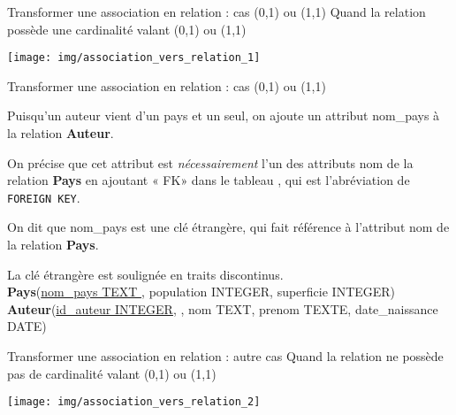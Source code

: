 \documentclass[10pt]{nsibeamer}
\begin{document}
\begin{frame}{Transformer une association en relation : cas (0,1) ou (1,1)}
	\alert{Quand la relation possède une cardinalité valant (0,1) ou (1,1)}
	\begin{center}
		\texttt{[image: img/association\_vers\_relation\_1]}
	\end{center}
\end{frame}



\begin{frame}{Transformer une association en relation : cas (0,1) ou (1,1)}

	Puisqu'un auteur vient d'un pays et un seul, on ajoute un attribut nom\_pays à la relation \textbf{Auteur}.

	On précise que cet attribut est \textit{nécessairement} l'un des attributs nom de la relation \textbf{Pays} en ajoutant « FK»  dans le tableau , qui est l'abréviation de \texttt{FOREIGN KEY}.

	On dit que nom\_pays est une \alert{clé étrangère}, qui \alert{fait référence} à l'attribut nom de la relation \textbf{Pays}.

	La clé étrangère est soulignée en traits discontinus.\\


	{\footnotesize
		\textbf{Pays}(\uline{nom\_pays TEXT }, population INTEGER, superficie INTEGER)}\\
	{\scriptsize\textbf{Auteur}(\uline{id\_auteur INTEGER},  , nom TEXT, prenom TEXTE, date\_naissance DATE)}
\end{frame}

\begin{frame}{Transformer une association en relation : autre cas}
	\alert{Quand la relation ne possède pas de cardinalité valant (0,1) ou (1,1)}
	\begin{center}
		\texttt{[image: img/association\_vers\_relation\_2]}
	\end{center}
\end{frame}
\end{document}
